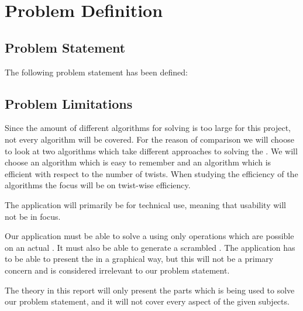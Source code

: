 \chapter{Problem Definition}
\emptyTop{}
\section{Problem Statement}
The following problem statement has been defined:




\section{Problem Limitations}
\label{sec:problemLimitations}
Since the amount of different algorithms for \rubik{} solving is too large for this project, not every algorithm will be covered.
For the reason of comparison we will choose to look at two algorithms which take different approaches to solving the \rubik{}. We will choose an algorithm which is easy to remember and an algorithm which is efficient with respect to the number of twists. When studying the efficiency of the algorithms the focus will be on twist-wise efficiency.

The \rubik{} application will primarily be for technical use, meaning that usability will not be in focus.

Our application must be able to solve a \rubik{} using only operations which are possible on an actual \rubik{}.
It must also be able to generate a scrambled \rubik{}.
The application has to be able to present the \rubik{} in a graphical way, but this will not be a primary concern and is considered irrelevant to our problem statement. 

The theory in this report will only present the parts which is being used to solve our problem statement, and it will not cover every aspect of the given subjects.